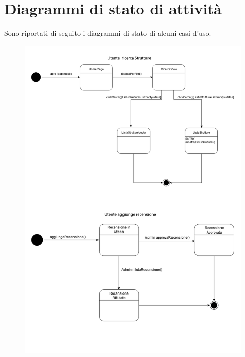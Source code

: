\section{Diagrammi di stato di attività}
Sono riportati di seguito i diagrammi di stato di alcuni casi d'uso.
\begin{figure}[h!]
    \includegraphics[width=\textwidth]{SequenceAnalisi/7.png}
\end{figure}
